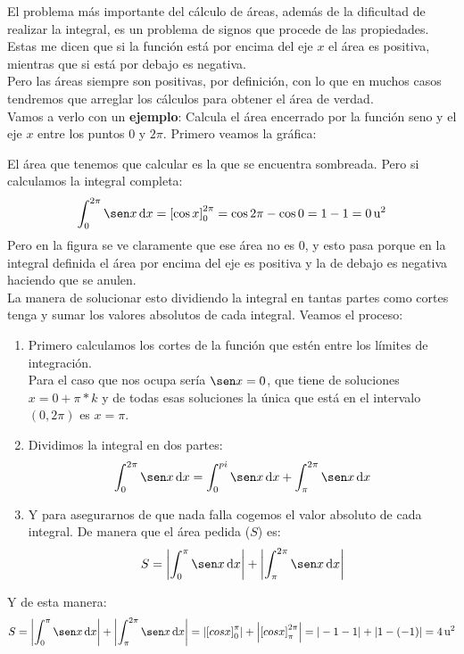 \documentclass[a4paper,11pt,answers]{exam}
\begin{document}
El problema más importante del cálculo de áreas, además de la dificultad de realizar la integral, es un problema de signos que procede de las propiedades.\\
Estas me dicen que si la función está por encima del eje $x$ el área es positiva, mientras que si está por debajo es negativa.\\
Pero las áreas siempre son positivas, por definición, con lo que en muchos casos tendremos que arreglar los cálculos para obtener el área de verdad.\\
Vamos a verlo con un \textbf{ejemplo}: Calcula el área encerrado por la función seno y el eje $x$ entre los puntos 0 y $2\pi$.
Primero veamos la gráfica:
\begin{center}
\end{center}

El área que tenemos que calcular es la que se encuentra sombreada. Pero si calculamos la integral completa:
\[\integrald{\sen x}{x}{0}{2\pi} = \left[\cos x\right]_0^{2\pi} = \cos 2\pi - \cos 0 = 1 - 1 = 0\,\text{u}^2\]
Pero en la figura se ve claramente que ese área no es 0, y esto pasa porque en la integral definida el área por encima del eje es positiva y la de debajo es negativa haciendo que se anulen.\\
La manera de solucionar esto dividiendo la integral en tantas partes como cortes tenga y sumar los valores absolutos de cada integral. Veamos el proceso:
\begin{enumerate}
	\item Primero calculamos los cortes de la función que estén entre los límites de integración.\\
	Para el caso que nos ocupa sería $\sen x = 0$, que tiene de soluciones $x = 0 + \pi*k$ y de todas esas soluciones la única que está en el intervalo $(0,2\pi)$ es $x=\pi$.
	\item Dividimos la integral en dos partes:
	\[\integrald{\sen x}{x}{0}{2\pi} = \integrald{\sen x}{x}{0}{pi} +
	\integrald{\sen x}{x}{\pi}{2\pi}\]
	\item Y para asegurarnos de que nada falla cogemos el valor absoluto de cada integral. De manera que el área pedida ($S$) es:
	\[S = \left|\integrald{\sen x}{x}{0}{\pi}\right| + \left|\integrald{\sen x}{x}{\pi}{2\pi}\right|\]
\end{enumerate}
Y de esta manera:
\[S = \left|\integrald{\sen x}{x}{0}{\pi}\right| + \left|\integrald{\sen x}{x}{\pi}{2\pi}\right| = \left|\left[cos x\right]_0^\pi \right| +
\left|\left[cos x\right]_\pi^{2\pi} \right| = |-1 -1| + |1 -(-1)| = 4\,\text{u}^2\]
\end{document}
